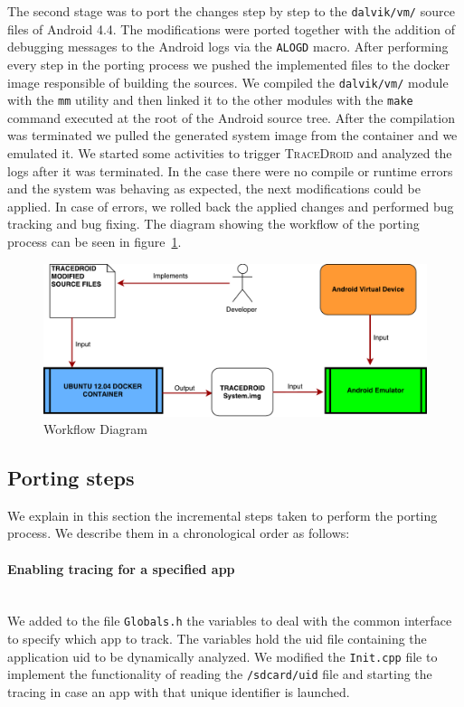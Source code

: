 The second stage was to port the changes step by step to the
\texttt{dalvik/vm/} source files of Android 4.4. The modifications were ported
together with the addition of debugging messages to the Android logs
via the \texttt{ALOGD} macro. After performing every step in the porting
process we pushed the implemented files to the docker image
responsible of building the sources. We compiled the \texttt{dalvik/vm/} module
with the \texttt{mm} utility and then linked it to the other modules with the
\texttt{make} command executed at the root of the Android source tree. After the compilation was
terminated we pulled the generated system image from the container and
we emulated it. We started some activities to trigger \textsc{TraceDroid} and
analyzed the logs after it was terminated. In the case there were no
compile or runtime errors and the system was behaving as expected, the
next modifications could be applied. In case of errors, we rolled back the
applied changes and performed bug tracking and bug fixing. The diagram
showing the workflow of the porting process can be seen in figure~\ref{fig:porting_workflow}.

\begin{figure}[!h]
    \centering
    \includegraphics[width=1\textwidth]{./img/porting/flowDiagram.pdf}
    \caption{Workflow Diagram}
    \label{fig:porting_workflow}
\end{figure}

\subsection{Porting steps}
\label{sec:porting_step}

We explain in this section the incremental steps taken to perform the
porting process. We describe them in a chronological order as follows:

\paragraph{Enabling tracing for a specified app} ~\\
We added to the file \texttt{Globals.h} the variables to deal with the
common interface to specify which app to track. The variables hold the
uid file containing the application uid to be dynamically
analyzed. We modified the \texttt{Init.cpp} file to implement the
functionality of reading the \texttt{/sdcard/uid} file and starting the
tracing in case an app with that unique identifier is launched.

